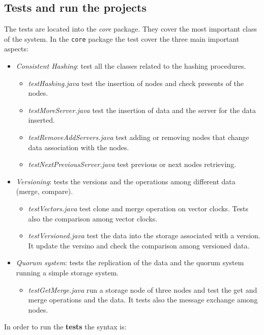 \subsection{Tests and run the projects}

The tests are located into the \textit{core} package. They cover the most important class of the system.
In the \texttt{core} package the test cover the three main important aspects:
\begin{itemize}
\item \textit{Consistent Hashing}: test all the classes related to the hashing procedures.
\begin{itemize}
\item \textit{testHashing.java} test the insertion of nodes and check presents of the nodes.
\item \textit{testMoreServer.java} test the insertion of data and the server for the data inserted.
\item \textit{testRemoveAddServers.java} test adding or removing nodes that change data association with the nodes.
\item \textit{testNextPreviousServer.java} test previous or next nodes retrieving.

\end{itemize}
\item \textit{Versioning}: tests the versions and the operations among different data (merge, compare).
\begin{itemize}
\item \textit{testVectors.java} test clone and  merge operation on vector clocks. Tests also the comparison among vector clocks.
\item \textit{testVersioned.java} test the data into the storage associated with a version. It update the versino and check the comparison among versioned data.
\end{itemize}
\item \textit{Quorum system}: tests the replication of the data and the quorum system running a simple storage system.
\begin{itemize}
\item \textit{testGetMerge.java} run a storage node of three nodes and test the get and merge operations and the data. It tests also the message exchange among nodes.
\end{itemize}
\end{itemize}

In order to run the \textbf{tests} the syntax is:

